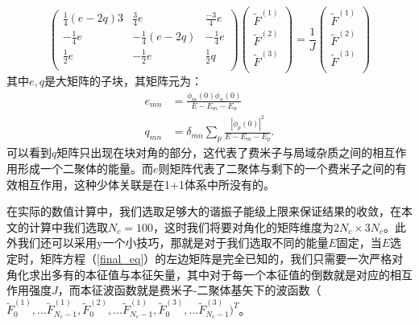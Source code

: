      \begin{equation}
      \left(
        \begin{array}{ccc}
        \frac{1}{4} (e-2 q) 3 & \frac{3}{4} e  & \frac{-3}{4}  e  \\
        -\frac{1}{4}e & -\frac{1}{4} (e-2 q) & -\frac{1}{4} e  \\
        \frac{1}{2} e  & -\frac{1}{2} e  & \frac{1}{2} q  \\
        \end{array}
      \right)
        \left(
            \begin{array}{c}
                \tilde{F}^{(1)} \\
                \tilde{F}^{(2)} \\
                \tilde{F}^{(3)} \\
            \end{array}
        \right)
        =\frac{1}{J}
        \left(
            \begin{array}{c}
                \tilde{F}^{(1)} \\
                \tilde{F}^{(2)} \\
                \tilde{F}^{(3)} \\
            \end{array}
        \right)   \label{final_eq}
    \end{equation}  
其中$e,q$是大矩阵的子块，其矩阵元为：
\begin{equation}
    \begin{split}
      e_{mn} &= \frac{\phi_m(0) \phi_n(0)}{E-E_m-E_n}\\
      q_{mn} &= \delta_{mn}  \sum_p \frac{|\phi_p(0)|^2}{E-E_m-E_p}.   
    \end{split}
\end{equation}
可以看到$q$矩阵只出现在块对角的部分，这代表了费米子与局域杂质之间的相互作用形成一个二聚体的能量。而$e$则矩阵代表了二聚体与剩下的一个费米子之间的有效相互作用，这种少体关联是在1+1体系中所没有的。

在实际的数值计算中，我们选取足够大的谐振子能级上限来保证结果的收敛，在本文的计算中我们选取$N_c=100$，这时我们将要对角化的矩阵维度为$2N_c\times 3N_c$。此外我们还可以采用y一个小技巧，那就是对于我们选取不同的能量$E$固定，当$E$选定时，矩阵方程（\ref{final_eq}）的左边矩阵是完全已知的，我们只需要一次严格对角化求出多有的本征值与本征矢量，其中对于每一个本征值的倒数就是对应的相互作用强度$J$，而本征波函数就是费米子-二聚体基矢下的波函数（$\tilde{F}^{(1)}_0,...\tilde{F}^{(1)}_{N_c-1},\tilde{F}^{(2)}_0,...\tilde{F}^{(1)}_{N_c-1},\tilde{F}^{(3)}_0,...\tilde{F}^{(3)}_{N_c-1})^T$。


